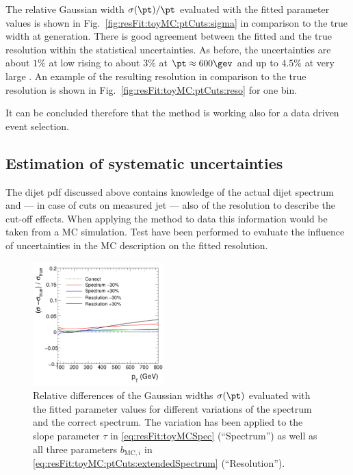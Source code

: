 \documentclass[a4paper]{cmspaper} %
\begin{document}
The relative Gaussian width $\sigma(\pt)/\pt$ evaluated with the fitted parameter values is shown in Fig.~\ref{fig:resFit:toyMC:ptCuts:sigma} in comparison to the true width at generation.
There is good agreement between the fitted and the true resolution within the statistical uncertainties.
As before, the uncertainties are about $1\%$ at low \pt rising to about $3\%$ at $\pt \approx 600\gev$ and up to $4.5\%$ at very large \pt.
An example of the resulting resolution in comparison to the true resolution is shown in Fig.~\ref{fig:resFit:toyMC:ptCuts:reso} for one \pttrue bin.

It can be concluded therefore that the method is working also for a data driven event selection.



\subsection{Estimation of systematic uncertainties}\label{sec:resFit:toyMC:uncert}

The dijet pdf discussed above contains knowledge of the actual dijet spectrum and --- in case of cuts on measured jet \pt --- also of the resolution to describe the cut-off effects.
When applying the method to data this information would be taken from a MC simulation.
Test have been performed to evaluate the influence of uncertainties in the MC description on the fitted resolution.

\begin{figure}[ht]
  \centering
  \includegraphics[width=0.45\textwidth]{figures/resFit_ToyMC_PtCuts_SigmaUncertainties}
  \caption{Relative differences of the Gaussian widths $\sigma(\pt)$ evaluated with the fitted parameter values for different variations of the spectrum and the correct spectrum.
    The variation has been applied to the slope parameter $\tau$ in \eqref{eq:resFit:toyMCSpec} (``Spectrum'') as well as all three parameters $b_{\text{MC},i}$ in \eqref{eq:resFit:toyMC:ptCuts:extendedSpectrum} (``Resolution'').}
  \label{fig:resFit:toyMC:uncert:systUncertainties}
\end{figure}
\end{document}
